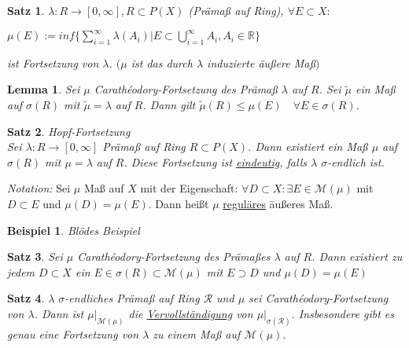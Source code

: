 \documentclass[11pt]{memoir}
\theoremstyle{changebreak}
\newtheorem{Beispiel}{Beispiel}[chapter]
\newtheorem{Lemma}{Lemma}[chapter]
\newtheorem{Satz}{Satz}[chapter]
\newcommand{\cara}{Carathéodory-Fortsetzung}
\begin{document}
\begin{Satz}
$\lambda: R \rightarrow [0, \infty], {}R \subset P(X)$ (Prämaß auf Ring), $\forall {}E \subset X:$ \\
\begin{center}
$\mu(E):= inf\{ \sum\limits_{i=1}^{\infty} \lambda(A_i) | E \subset \bigcup\limits_{i=1}^{\infty} A_i, A_i \in \mathbb{R}\}$
\end{center}
ist Fortsetzung von $\lambda$. $(\mu$ ist das durch $\lambda$ induzierte äußere Maß$)$
\end{Satz}

\begin{Lemma}
Sei $\mu$ \cara{} des Prämaß $\lambda$ auf $R$. Sei $\tilde{\mu}$ ein Maß auf $\sigma(R)$ mit $\tilde{\mu} = \lambda$ auf $R$. Dann gilt $\tilde{\mu}(R) \leq \mu(E)\quad \forall E \in \sigma(R)$.
\end{Lemma}

\begin{Satz} \emph{Hopf-Fortsetzung} \\
Sei $\lambda: R \rightarrow [0, \infty]$ Prämaß auf Ring $R \subset P(X)$. Dann existiert ein Maß $\mu$ auf $\sigma(R)$ mit $\mu =\lambda$ auf $R$. Diese Fortsetzung ist \underline{eindeutig}, falls $\lambda$ $\sigma$-endlich ist.
\end{Satz}

\emph{Notation:}
Sei $\mu$ Maß auf $X$ mit der Eigenschaft: $\forall D \subset X: \exists E \in \mathscr{M}(\mu)$ mit $D \subset E$ und $\mu(D) = \mu(E)$. Dann heißt $\mu$ \underline{reguläres} äußeres Maß.

\begin{Beispiel}
Blödes Beispiel
\end{Beispiel}

\begin{Satz}
Sei $\mu$ \cara{} des Prämaßes $\lambda$ auf $R$. Dann existiert zu jedem $D \subset X$ ein $E \in \sigma(R) \subset \mathscr M(\mu)$ mit $E \supset D$ und $\mu(D) = \mu(E)$
\end{Satz}

\begin{Satz}
$\lambda$  $\sigma$-endliches Prämaß auf Ring $\mathscr R$ und $\mu$ sei \cara{} von $\lambda$. Dann ist $\mu|_{\mathscr M(\mu)}$ die \underline{Vervollständigung} von $\mu|_{\sigma(\mathscr R)}$. Insbesondere gibt es genau eine Fortsetzung von $\lambda$ zu einem Maß auf $\mathscr M(\mu)$.
\end{Satz}
\end{document}
